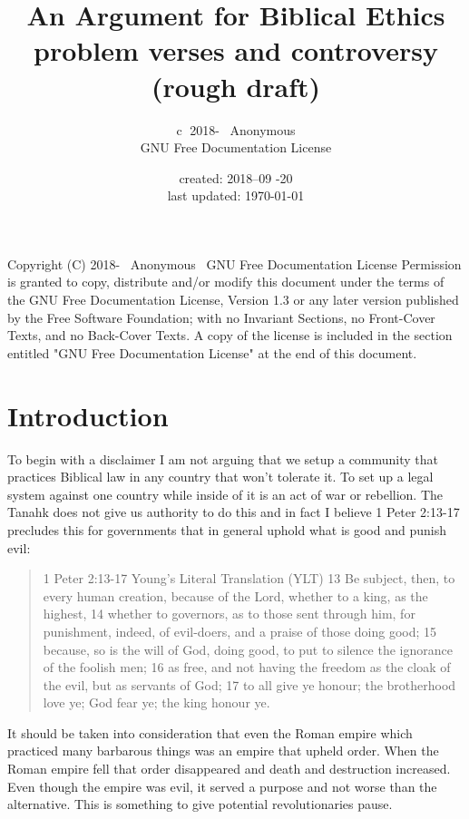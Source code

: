 \documentclass[11pt]{article}
\title{\textbf{An Argument for Biblical Ethics} \large \\ problem verses and controversy (rough draft) }
\author{\textcircled{c} 2018-\the\year
 \ Anonymous \\ GNU Free Documentation License  }
\date{created: 2018--09 -20 \\ last updated: \today{}}
\begin{document}
\maketitle
\tableofcontents 

\noindent \newline Copyright (C) 2018-\the\year
 \ Anonymous \ GNU Free Documentation License \newline
Permission is granted to copy, distribute and/or modify this document\newline
under the terms of the GNU Free Documentation License, Version 1.3\newline
or any later version published by the Free Software Foundation;\newline
with no Invariant Sections, no Front-Cover Texts, and no Back-Cover Texts.\newline
A copy of the license is included in the section entitled "GNU\newline
Free Documentation License" at the end of this document.

\section{Introduction}
To begin with a disclaimer I am not arguing that we setup a community that practices Biblical law in any country that won't tolerate it. To set up a legal system against one country while inside of it is an act of war or rebellion. The Tanahk does not give us authority to do this and in fact I believe 1 Peter 2:13-17 precludes this for governments that in general uphold what is good and punish evil: 

\begin{quote}
1 Peter 2:13-17 Young's Literal Translation (YLT)
13 Be subject, then, to every human creation, because of the Lord, whether to a king, as the highest,
14 whether to governors, as to those sent through him, for punishment, indeed, of evil-doers, and a praise of those doing good;
15 because, so is the will of God, doing good, to put to silence the ignorance of the foolish men;
16 as free, and not having the freedom as the cloak of the evil, but as servants of God;
17 to all give ye honour; the brotherhood love ye; God fear ye; the king honour ye.
\end{quote}

It should be taken into consideration that even the Roman empire which practiced many barbarous things was an empire that upheld order. When the Roman empire fell that order disappeared and death and destruction increased. Even though the empire was evil, it served a purpose and not worse than the alternative. This is something to give potential revolutionaries pause.
\end{document}
